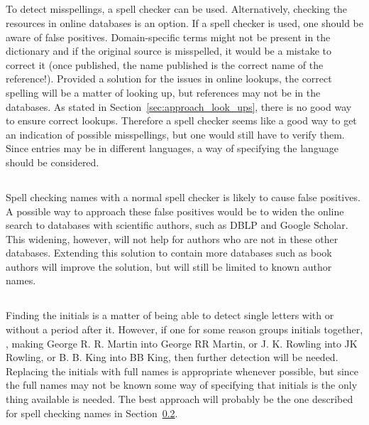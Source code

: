 \subsection{}

To detect misspellings, a spell checker can be used.  Alternatively,
checking the resources in online databases is an option.  If a spell
checker is used, one should be aware of false positives.
Domain-specific terms might not be present in the dictionary and if
the original source is misspelled, it would be a mistake to correct it
(once published, the name published is the correct name of the
reference!).  Provided a solution for the issues in online lookups,
the correct spelling will be a matter of looking up, but references
may not be in the databases.  As stated in
Section~\ref{sec:approach_look_ups}, there is no good way to ensure
correct lookups.  Therefore a spell checker seems like a good way to
get an indication of possible misspellings, but one would still have
to verify them.  Since entries may be in different languages, a way of
specifying the language should be considered.


\subsection{}
\label{sec:approach_spelling_names}

Spell checking names with a normal spell checker is likely to cause
false positives.  A possible way to approach these false positives
would be to widen the online search to databases with scientific
authors, such as DBLP and Google Scholar.  This widening, however,
will not help for authors who are not in these other databases.
Extending this solution to contain more databases such as book authors
will improve the solution, but will still be limited to known author
names.


\subsection{}

Finding the initials is a matter of being able to detect single
letters with or without a period after it.  However, if one for some
reason groups initials together, \eg, making George R. R. Martin into
George RR Martin, or J. K. Rowling into JK Rowling, or B. B. King into
BB King, then further detection will be needed.  Replacing the
initials with full names is appropriate whenever possible, but since
the full names may not be known some way of specifying that initials
is the only thing available is needed.  The best approach will
probably be the one described for spell checking names in
Section~\ref{sec:approach_spelling_names}.


